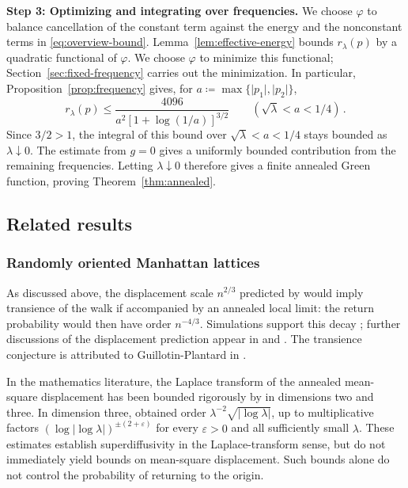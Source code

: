 \documentclass[11pt]{amsart}
\theoremstyle{plain}
\theoremstyle{definition}
\newcommand{\1}{\mathbf 1}
\newcommand{\abs}[1]{\lvert #1\rvert}
\begin{document}
	\medskip
	\noindent\textbf{Step 3: Optimizing and integrating over frequencies.}
	We choose $\varphi$ to balance cancellation of the constant term
	against the energy and the nonconstant terms in
	\eqref{eq:overview-bound}.  Lemma~\ref{lem:effective-energy} bounds
	$r_\lambda(p)$ by a quadratic functional of $\varphi$.  We choose
	$\varphi$ to minimize this functional; Section~\ref{sec:fixed-frequency}
	carries out the minimization. In particular, Proposition~\ref{prop:frequency} gives, for
	$a\coloneqq\max\{\abs{p_1},\abs{p_2}\}$,
	\begin{equation*}
	  r_\lambda(p)\leq\frac{4096}{a^2[1+\log(1/a)]^{3/2}}
	  \qquad(\sqrt\lambda<a<1/4)\, .
	\end{equation*}
	Since $3/2>1$, the integral of this bound over
	$\sqrt\lambda<a<1/4$ stays bounded as $\lambda\downarrow0$.
	The estimate from $g=0$ gives a uniformly bounded contribution from
	the remaining frequencies.  Letting $\lambda\downarrow0$ therefore
	gives a finite annealed Green function, proving
	Theorem~\ref{thm:annealed}.
	
	\subsection{Related results}\label{ssec:related-work}
	
	\subsubsection{Randomly oriented Manhattan lattices}\label{sssec:oriented}
	As discussed above, the displacement scale $n^{2/3}$ predicted by \citet*{Red89}
	would imply transience of the walk if accompanied by an annealed local limit: the return
	probability would then have order $n^{-4/3}$.  Simulations support this decay
	\citep*[Section~3.2]{MNOV20}; further discussions of the displacement
	prediction appear in \citet*{BG90} and
	\citet*[Section~3.5]{Pen20}.  The transience conjecture is attributed
	to Guillotin-Plantard in \citet*[Appendix~A]{Bos19}.
	
	In the mathematics literature, the Laplace transform of the annealed
	mean-square displacement has been bounded rigorously by 
	\citet*[Theorem~1.1]{LTV18} in dimensions two and three.  In dimension three,
	\citet*[Theorem~1.1]{Ngu26} obtained order
	$\lambda^{-2}\sqrt{\abs{\log\lambda}}$, up to multiplicative factors
	$(\log\abs{\log\lambda})^{\pm(2+\varepsilon)}$ for every
	$\varepsilon>0$ and all sufficiently small $\lambda$.
	These estimates establish superdiffusivity in the Laplace-transform sense, but do not immediately yield bounds on mean-square displacement. Such bounds alone do not control the probability of returning to the origin.
	
\end{document}
